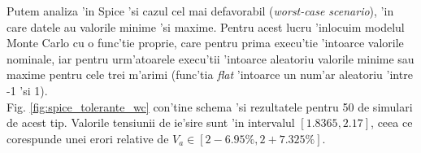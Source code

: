 \begin{definition}[facultativ]
Putem analiza 'in Spice 'si cazul cel mai defavorabil (\textit{worst-case scenario}), 'in care datele au valorile minime 'si maxime. Pentru acest lucru 'inlocuim modelul Monte Carlo cu o func'tie proprie, care pentru prima execu'tie 'intoarce valorile nominale, iar pentru urm'atoarele execu'tii 'intoarce aleatoriu valorile minime sau maxime pentru cele trei m'arimi (func'tia \textit{flat} 'intoarce un num'ar aleatoriu 'intre -1 'si 1).\\

Fig. \ref{fig:spice_tolerante_wc} con'tine schema 'si rezultatele pentru 50 de simulari de acest tip. Valorile tensiunii de ie'sire sunt 'in intervalul $[1.8365, 2.17]$, ceea ce corespunde unei erori relative de $V_a \in \left[2-6.95\%, 2+7.325\%\right]$.
\end{definition} 


